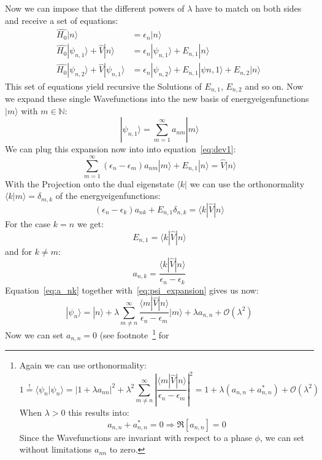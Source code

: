 Now we can impose that the different powers of $\lambda$ have to
match on both sides and receive a set of equations:
\begin{align}
    \hat{H_0} |n\rangle &= \epsilon_n |n\rangle\\
    \hat{H_0} |\psi_{n,1}\rangle + \hat{V}|n\rangle &=
    \epsilon_n |\psi_{n,1}\rangle + E_{n,1}|n\rangle \label{eq:dev1}\\
    \hat{H_0} |\psi_{n,2}\rangle + \hat{V}|\psi_{n,1}\rangle &=
    \epsilon_n |\psi_{n,2}\rangle + E_{n,1}|\psi{n,1}\rangle 
    + E_{n,2}|n\rangle \label{eq:dev2}\
\end{align}
This set of equations yield recursive the Solutions of $E_{n,1}$,
$E_{n,2}$ and so on. Now we expand these single Wavefunctions 
into the new basis of energyeigenfunctions $|m \rangle$ with $m\in 
\mathbb{N}$:
\begin{equation}
    |\psi_{n,1}\rangle = \sum_{m=1}^{\infty} a_{nm} |m \rangle
    \label{eq:psi_expansion}
\end{equation}
We can plug this expansion now into into equation~\eqref{eq:dev1}:
\begin{equation}
    \sum_{m=1}^{\infty} (\epsilon_n - \epsilon_m) a_{nm} |m\rangle
    + E_{n,1} |n\rangle = \hat{V}|n \rangle
\end{equation}
With the Projection onto the dual eigenstate $\langle k|$ we can
use the orthonormality $\langle k | m \rangle = \delta_{m,k}$ 
of the energyeigenfunctions:
\begin{equation}
     (\epsilon_n - \epsilon_k) a_{nk} 
     + E_{n,1}\delta_{n,k}  = \langle k |\hat{V}|n \rangle
\end{equation}
For the case $k = n$ we get:
\begin{equation}
    E_{n,1} = \langle k |\hat{V}|n \rangle
\end{equation}
and for $k\neq m$:
\begin{equation}
    a_{n,k} = \frac{\langle k |\hat{V}|n \rangle}
    {\epsilon_n - \epsilon_k} \label{eq:a_nk}
\end{equation}
Equation~\eqref{eq:a_nk} together with~\eqref{eq:psi_expansion} 
gives us now:
\begin{equation}
    |\psi_{n}\rangle = |n\rangle + \lambda \sum_{m\neq n}^{\infty}
    \frac{\langle m |\hat{V}|n \rangle}{\epsilon_n - \epsilon_m}  
    |m \rangle + \lambda a_{n,n} + \mathcal{O}(\lambda^2)
\end{equation}
Now we can set $a_{n,n}=0$ (see footnote~\footnote{
Again we can use orthonormality:
\begin{equation*}
    1\overset{!}{=} \langle \psi_n|\psi_{n}\rangle 
    = \left | 1 + \lambda a_{nn} \right |^2 + \lambda^2
    \sum_{m\neq n}^{\infty}
    \left | \frac{\langle m |\hat{V}|n \rangle}
        {\epsilon_n - \epsilon_m} \right |^2 = 
    1 + \lambda (a_{n,n} + a^*_{n,n}) + \mathcal{O}(\lambda^2)
\end{equation*}
When $\lambda > 0 $ this results into:
\begin{equation*}
    a_{n,n} + a^*_{n,n} = 0 \Rightarrow \Re  [a_{n,n}] = 0
\end{equation*}
Since the Wavefunctions 
are invariant with respect to a phase $\phi$,
we can set without limitations $a_{nn}$ to zero.} for
